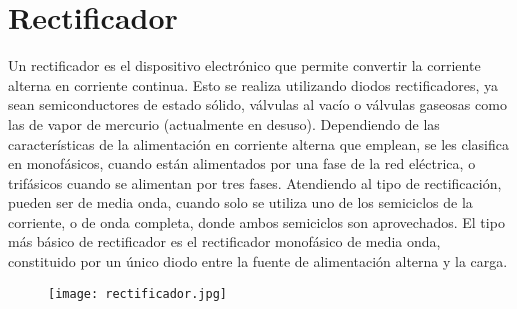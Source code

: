 \documentclass[a4paper,12pt]{report}
\begin{document}
\chapter{Rectificador}
Un rectificador es el dispositivo electrónico que permite convertir la corriente alterna en corriente continua. Esto se realiza utilizando diodos rectificadores, ya sean semiconductores de estado sólido, válvulas al vacío o válvulas gaseosas como las de vapor de mercurio (actualmente en desuso). Dependiendo de las características de la alimentación en corriente alterna que emplean, se les clasifica en monofásicos, cuando están alimentados por una fase de la red eléctrica, o trifásicos cuando se alimentan por tres fases.
Atendiendo al tipo de rectificación, pueden ser de media onda, cuando solo se utiliza uno de los semiciclos de la corriente, o de onda completa, donde ambos semiciclos son aprovechados. El tipo más básico de rectificador es el rectificador monofásico de media onda, constituido por un único diodo entre la fuente de alimentación alterna y la carga.
\begin{figure}[H]
\centering
\texttt{[image: rectificador.jpg]}
\end{figure}
\end{document}

